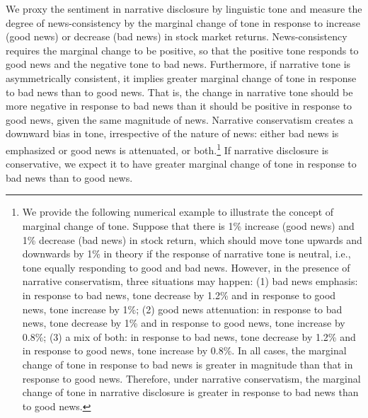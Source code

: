 \documentclass[letterpaper,12pt]{article}
\begin{document}
\begin{spacing}{1.5}
We proxy the sentiment in narrative disclosure by linguistic tone and measure the degree of news-consistency by the marginal change of tone in response to increase (good news) or decrease (bad news) in stock market returns. News-consistency requires the marginal change to be positive, so that the positive tone responds to good news and the negative tone to bad news. Furthermore, if narrative tone is asymmetrically consistent, it implies greater marginal change of tone in response to bad news than to good news. That is, the change in narrative tone should be more negative in response to bad news than it should be positive in response to good news, given the same magnitude of news. Narrative conservatism creates a downward bias in tone, irrespective of the nature of news: either bad news is emphasized or good news is attenuated, or both.\footnote{We provide the following numerical example to illustrate the concept of marginal change of tone. Suppose that there is 1\% increase (good news) and 1\% decrease (bad news) in stock return, which should move tone upwards and downwards by 1\% in theory if the response of narrative tone is neutral, i.e., tone equally responding to good and bad news. However, in the presence of narrative conservatism, three situations may happen: (1) bad news emphasis: in response to bad news, tone decrease by 1.2\% and in response to good news, tone increase by 1\%; (2) good news attenuation: in response to bad news, tone decrease by 1\% and in response to good news, tone increase by 0.8\%; (3) a mix of both: in response to bad news, tone decrease by 1.2\% and in response to good news, tone increase by 0.8\%. In all cases, the marginal change of tone in response to bad news is greater in magnitude than that in response to good news. Therefore, under narrative conservatism, the marginal change of tone in narrative disclosure is greater in response to bad news than to good news.} If narrative disclosure is conservative, we expect it to have greater marginal change of tone in response to bad news than to good news.


\end{spacing}
\end{document}
